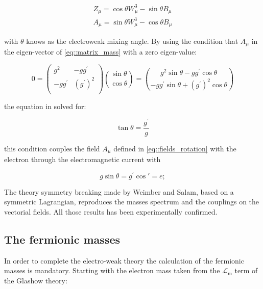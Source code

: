 \begin{equation}
\begin{array}{c}
Z_{\mu} = \cos\theta W^{3}_{\mu} -\sin\theta B_{\mu}\\
A_{\mu} =\sin\theta W^{3}_{\mu} - \cos\theta B_{\mu}

\end{array}
\label{eq::fields_rotation}
\end{equation}

with $\theta$ knows as the electroweak mixing angle. By using the condition that $A_{\mu}$ in the eigen-vector of \autoref{eq::matrix_mass} with a zero eigen-value:

\begin{equation}
0 = 
\begin{pmatrix}
g^{2} & -gg^{\prime} \\
-gg^{\prime} & (g^{\prime})^{2} \\
\end{pmatrix}
\binom{\sin\theta}{\cos\theta}
=
\binom{g^{2}\sin\theta - gg^{\prime}\cos\theta}{-gg^{\prime}\sin\theta + (g^{\prime})^{2}\cos\theta}
\label{eq::matrix_rotation}
\end{equation}

the equation in solved for:

\begin{equation}
\tan\theta = \dfrac{g^{\prime}}{g}
\label{eq::matrix_solution}
\end{equation}

this condition couples the field $A_{\mu}$ defined in \autoref{eq::fields_rotation} with the electron through the electromagnetic current with

\begin{equation}
g\sin\theta = g^{\prime} \cos\prime = e; 
\end{equation}

The theory symmetry breaking made by Weimber and Salam, based on a symmetric Lagrangian, reproduces the masses spectrum and the couplings on the vectorial fields. All those results has been experimentally confirmed.

\subsection{The fermionic masses}

In order to complete the electro-weak theory the calculation of the fermionic masses is mandatory. Starting with the electron mass taken from the $\mathcal{L}_{\text{m}}$ term of the Glashow theory:

